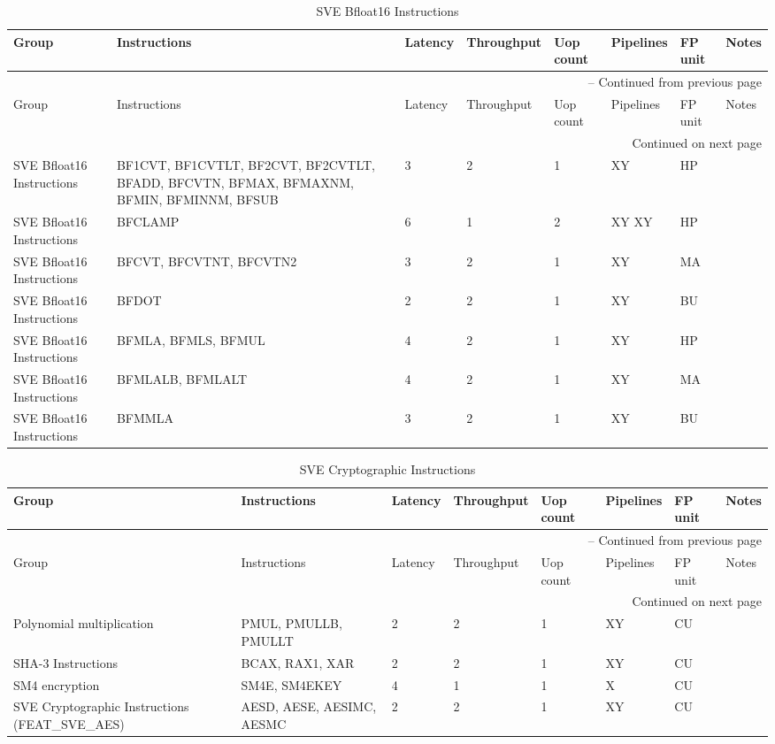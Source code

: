 \begin{longtable}{|p{1in}|p{1in}|l|l|l|p{1in}|l|p{1in}|}
\caption{SVE Bfloat16 Instructions} \\
\hline
Group & Instructions & Latency & Throughput & Uop count & Pipelines & FP unit & Notes\\
\hline
\endfirsthead
\hline
\multicolumn{8}{|r|}{{\tablename\ \thetable{} -- Continued from previous page}} \\
\hline
Group & Instructions & Latency & Throughput & Uop count & Pipelines & FP unit & Notes\\
\hline
\endhead
\hline
\multicolumn{8}{|r|}{{Continued on next page}} \\
\hline
\endfoot
\hline
\endlastfoot
SVE Bfloat16 Instructions & BF1CVT, BF1CVTLT, BF2CVT, BF2CVTLT, BFADD, BFCVTN, BFMAX, BFMAXNM, BFMIN, BFMINNM, BFSUB & 3 & 2 & 1 & XY & HP & \\
\hline
SVE Bfloat16 Instructions & BFCLAMP & 6 & 1 & 2 & XY XY & HP & \\
\hline
SVE Bfloat16 Instructions & BFCVT, BFCVTNT, BFCVTN{{2}} & 3 & 2 & 1 & XY & MA & \\
\hline
SVE Bfloat16 Instructions & BFDOT & 2 & 2 & 1 & XY & BU & \\
\hline
SVE Bfloat16 Instructions & BFMLA, BFMLS, BFMUL & 4 & 2 & 1 & XY & HP & \\
\hline
SVE Bfloat16 Instructions & BFMLALB, BFMLALT & 4 & 2 & 1 & XY & MA & \\
\hline
SVE Bfloat16 Instructions & BFMMLA & 3 & 2 & 1 & XY & BU & \\
\hline
\end{longtable}
\newpage
\begin{longtable}{|p{1in}|p{1in}|l|l|l|p{1in}|l|p{1in}|}
\caption{SVE Cryptographic Instructions} \\
\hline
Group & Instructions & Latency & Throughput & Uop count & Pipelines & FP unit & Notes\\
\hline
\endfirsthead
\hline
\multicolumn{8}{|r|}{{\tablename\ \thetable{} -- Continued from previous page}} \\
\hline
Group & Instructions & Latency & Throughput & Uop count & Pipelines & FP unit & Notes\\
\hline
\endhead
\hline
\multicolumn{8}{|r|}{{Continued on next page}} \\
\hline
\endfoot
\hline
\endlastfoot
Polynomial multiplication & PMUL, PMULLB, PMULLT & 2 & 2 & 1 & XY & CU & \\
\hline
SHA-3 Instructions & BCAX, RAX1, XAR & 2 & 2 & 1 & XY & CU & \\
\hline
SM4 encryption & SM4E, SM4EKEY & 4 & 1 & 1 & X & CU & \\
\hline
SVE Cryptographic Instructions (FEAT\_SVE\_AES) & AESD, AESE, AESIMC, AESMC & 2 & 2 & 1 & XY & CU & \\
\hline
\end{longtable}
